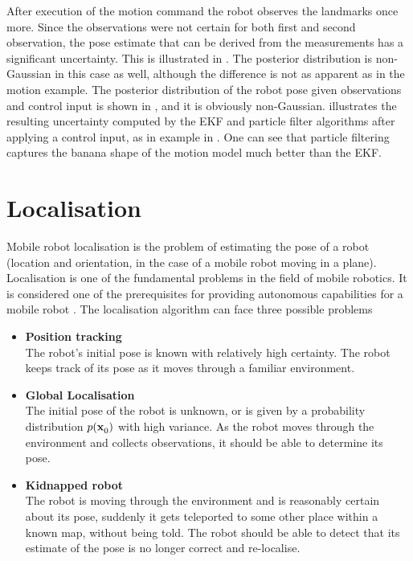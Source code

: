 After execution of the motion command the robot observes the landmarks
once more. Since the observations were not certain for both first and
second observation, the pose estimate that can be derived from the
measurements has a significant uncertainty. This is illustrated in
. The posterior distribution is non-Gaussian
in this case as well, although the difference is not as apparent as in
the motion example. The posterior distribution of the robot pose given
observations and control input is shown in
, and it is obviously non-Gaussian.
 illustrates the resulting uncertainty
computed by the EKF and particle filter algorithms after applying a
control input, as in example in . One can see
that particle filtering captures the banana shape of the motion model
much better than the EKF.


\section{Localisation} 
\label{sec:Localisation}


Mobile robot localisation is the problem of estimating the pose of a
robot (location and orientation, in the case of a mobile robot moving
in a plane). Localisation is one of the fundamental problems in the
field of mobile robotics. It is considered one of the prerequisites
for providing autonomous capabilities for a mobile robot \cite{Cox91}.
The localisation algorithm can face three possible problems

\begin{itemize}
\item {\bf Position tracking}\\
      The robot's initial pose is known with relatively high
      certainty. The robot keeps track of its pose as it moves through a
      familiar environment.

\item {\bf Global Localisation}\\ 
      The initial pose of the robot is unknown, or is given by a
      probability distribution $p(\x{0}{}{})$ with high variance. As
      the robot moves through the environment and collects
      observations, it should be able to determine its pose.

\item {\bf Kidnapped robot}\\
      The robot is moving through the environment and is reasonably
      certain about its pose, suddenly it gets teleported to some
      other place within a known map, without being told. The robot
      should be able to detect that its estimate of the pose is no
      longer correct and re-localise.
\end{itemize}

